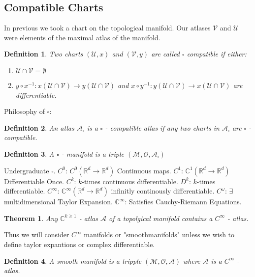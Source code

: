 \documentclass[10pt, oneside]{article}
\newcommand{\R}{\mathbb{R}}
\newcommand{\C}{\mathbb{C}}
\newcommand{\M}{\mathcal{M}}
\newtheorem{thm}{Theorem}
\newtheorem{defn}{Definition}
\begin{document}
   \subsection*{Compatible Charts}
      In previous we took a chart on the topological manifold. Our atlases $\mathcal{V}$ and $\mathcal{U}$ were elements of the maximal atlas of the manifold. 
      \begin{defn}
         Two charts $(\mathcal{U},x)$ and $(\mathcal{V},y)$ are called $\square$ compatible if either:
         \begin{enumerate}
         \item $\mathcal{U} \cap \mathcal{V} = \emptyset$
         \item $y \circ x^{-1}: x(\mathcal{U} \cap \mathcal{V}) \to y(\mathcal{U} \cap \mathcal{V})$ and $x \circ y^{-1}: y(\mathcal{U} \cap \mathcal{V}) \to x(\mathcal{U} \cap \mathcal{V})$ are differentiable. 
         \end{enumerate}
      \end{defn}
      Philosophy of $\square$:
         \begin{defn}
            An atlas $\mathcal{A}_\square$ is a $\square$ - compatible atlas if any two charts in $\mathcal{A}_\square$ are $\square$ - compatible. 
         \end{defn}
         \begin{defn}
            A $\square$ - manifold is a triple $(\M, \mathcal{O}, \mathcal{A}_\square)$
         \end{defn}
      Undergraduate $\square$. $C^0$: $C^0 (\R^d \to \R^d)$ Continuous maps. $C^1$: $\C^1 (\R^d \to \R^d)$ Differentiable Once. $C^k$: $k$-times continuous differentiable. 
      $D^k$: $k$-times differentiable. $C^\infty$: $\C^\infty (\R^d \to \R^d)$ infinitly continously differentiable. $C^\omega$: $\exists$ multidimensional Taylor Expansion.
      $\C^\infty$: Satisfies Cauchy-Riemann Equations. 
      \begin{thm}
         Any $\C^{k \geq 1}$ - atlas $\mathcal{A}$ of a topolgical manifold contains a $C^\infty$ - atlas. 
      \end{thm}
      Thus we will consider $C^\infty$ manifolds or "smoothmanifolds" unless we wish to define taylor expantions or complex differentiable. 
      \begin{defn}
         A smooth manifold is a tripple $(\M,\mathcal{O}, \mathcal{A})$ where $\mathcal{A}$ is a $C^\infty$ - atlas. 
      \end{defn}
\end{document}
